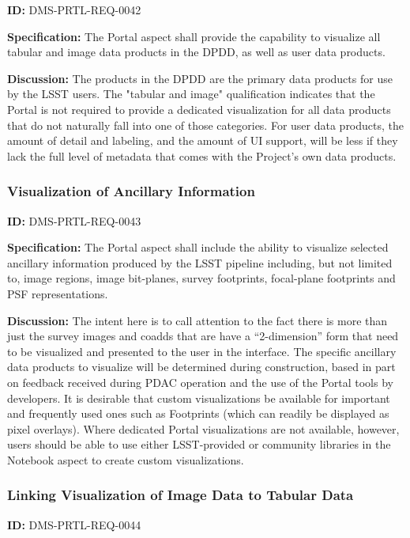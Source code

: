 \documentclass[SE,toc]{lsstdoc}
\begin{document}
\label{DMS-PRTL-REQ-0042}
\textbf{ID:} DMS-PRTL-REQ-0042

\textbf{Specification:}
The Portal aspect shall provide the capability to visualize all tabular and image data products in the DPDD, as well as user data products.

\textbf{Discussion:}
The products in the DPDD are the primary data products for use by the LSST users.  The "tabular and image" qualification indicates that the Portal is not required to provide a dedicated visualization for all data products that do not naturally fall into one of those categories.
For user data products, the amount of detail and labeling, and the amount of UI support, will be less if they lack the full level of metadata that comes with the Project's own data products.

\subsubsection{Visualization of Ancillary Information}

\label{DMS-PRTL-REQ-0043}
\textbf{ID:} DMS-PRTL-REQ-0043

\textbf{Specification:}
The Portal aspect shall include the ability to visualize selected ancillary information produced by the LSST pipeline including, but not limited to, image regions, image bit-planes, survey footprints, focal-plane footprints and PSF representations.

\textbf{Discussion:}
The intent here is to call attention to the fact there is more than just the survey images and coadds that are have a “2-dimension” form that need to be visualized and presented to the user in the interface.
The specific ancillary data products to visualize will be determined during construction, based in part on feedback received during PDAC operation and the use of the Portal tools by developers.
It is desirable that custom visualizations be available for important and frequently used ones such as Footprints (which can readily be displayed as pixel overlays).  Where dedicated Portal visualizations are not available, however, users should be able to use either LSST-provided or community libraries in the Notebook aspect to create custom visualizations.

\subsubsection{Linking Visualization of Image Data to Tabular Data}

\label{DMS-PRTL-REQ-0044}
\textbf{ID:} DMS-PRTL-REQ-0044
\end{document}

